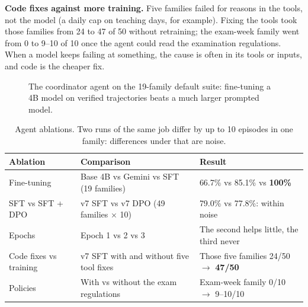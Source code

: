 \documentclass[11pt,a4paper]{article}
\newcommand{\best}[1]{\textbf{#1}}
\begin{document}
\textbf{Code fixes against more training.} Five families failed for reasons in the tools, not the model (a daily cap
on teaching days, for example). Fixing the tools took those families from 24 to 47 of 50 without retraining; the
exam-week family went from 0 to 9--10 of 10 once the agent could read the examination regulations. When a model keeps
failing at something, the cause is often in its tools or inputs, and code is the cheaper fix.

\begin{figure}[!htb]
\centering
{}
\caption{The coordinator agent on the 19-family default suite: fine-tuning a 4B model on verified trajectories beats
a much larger prompted model.}
\label{fig:abl-agent}
\end{figure}

\begin{table}[!htb]
\centering\small
\begin{tabularx}{\textwidth}{@{}L{3.0cm} L{4.6cm} Y@{}}
\toprule
\textbf{Ablation} & \textbf{Comparison} & \textbf{Result}\\
\midrule
Fine-tuning & Base 4B vs Gemini vs SFT (19 families) & 66.7\% vs 85.1\% vs \best{100\%}\\
SFT vs SFT + DPO & v7 SFT vs v7 DPO (49 families $\times$ 10) & 79.0\% vs 77.8\%: within noise\\
Epochs & Epoch 1 vs 2 vs 3 & The second helps little, the third never\\
Code fixes vs training & v7 SFT with and without five tool fixes & Those five families 24/50 $\to$ \best{47/50}\\
Policies & With vs without the exam regulations & Exam-week family 0/10 $\to$ 9--10/10\\
\bottomrule
\end{tabularx}
\caption{Agent ablations. Two runs of the same job differ by up to 10 episodes in one family: differences under
that are noise.}
\label{tab:abl-agent}
\end{table}
\end{document}
